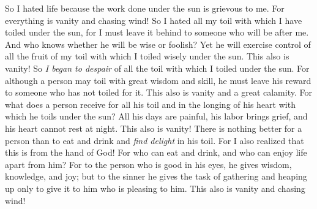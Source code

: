 \begin{biblechapter}
\verse So I hated life because the work done under the sun is grievous to me. For everything is vanity and chasing wind!
\verse So I hated all my toil with which I have toiled under the sun, for I must leave it behind to someone who will be after me.
\verse And who knows whether he will be wise or foolish? Yet he will exercise control of all the fruit of my toil with which I toiled wisely under the sun. This also is vanity!
\verse So \textit{I began to despair} of all the toil with which I toiled under the sun.
\verse For although a person may toil with great wisdom and skill, he must leave his reward to someone who has not toiled for it. This also is vanity and a great calamity.
\verse For what does a person receive for all his toil and in the longing of his heart with which he toils under the sun?
\verse All his days are painful, his labor brings grief, and his heart cannot rest at night. This also is vanity!
 There is nothing better for a person than to eat and drink and \textit{find delight} in his toil. For I also realized that this is from the hand of God!
\verse For who can eat and drink, and who can enjoy life apart from him?
\verse For to the person who is good in his eyes, he gives wisdom, knowledge, and joy; but to the sinner he gives the task of gathering and heaping up only to give it to him who is pleasing to him. This also is vanity and chasing wind!
\end{biblechapter}

